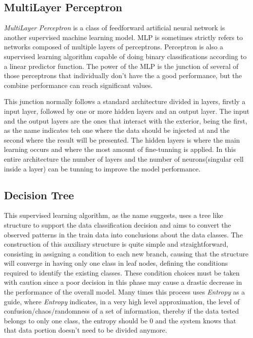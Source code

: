 \documentclass[conference]{IEEEtran}
\begin{document}
\subsection{MultiLayer Perceptron}
\textit{MultiLayer Perceptron} is a class of feedforward artificial neural network is another supervised machine learning model. MLP is sometimes strictly refers to networks composed of multiple layers of perceptrons. Perceptron is also a supervised learning algorithm capable of doing binary classifications according to a linear predictor function. The power of the MLP is the junction of several of those perceptrons that individually don't have the a good performance, but the combine performance can reach significant values.

This junction normally follows a standard architecture divided in layers, firstly a input layer, followed by one or more hidden layers and an output layer. The input and the output layers are the ones that interact with the exterior, being the first, as the name indicates teh one where the data should be injected at and the second where the result will be presented. The hidden layers is where the main learning occurs and where the most amount of fine-tunning is applied. In this entire architecture the number of layers and the number of neurons(singular cell inside a layer) can be tunning to improve the model performance.

\subsection{Decision Tree}
This supervised learning algorithm, as the name suggests, uses a tree like structure to support the data classification decision and aims to convert the observed patterns in the train data into conclusions about the data classes. The construction of this auxiliary structure is quite simple and straightforward, consisting in assigning a condition to each new branch, causing that the structure will converge in having only one class in leaf nodes, defining the conditions required to identify the existing classes. These condition choices must be taken with caution since a poor decision in this phase may cause a drastic decrease in the performance of the overall model. Many times this process uses \textit{Entropy} as a guide, where \textit{Entropy} indicates, in a very high level approximation, the level of confusion/chaos/randomness of a set of information, thereby if the data tested belongs to only one class, the entropy should be 0 and the system knows that that data portion doesn't need to be divided anymore.
\end{document}
